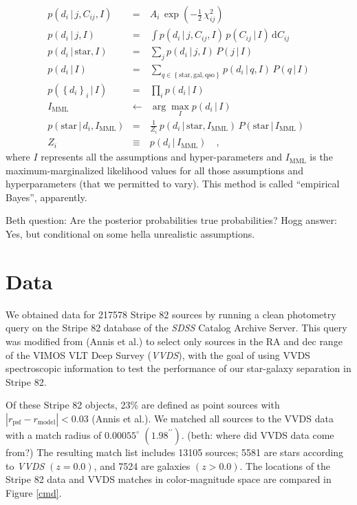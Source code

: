 \documentclass[12pt]{article}
\newcommand{\project}[1]{\textsl{#1}}
\newcommand{\given}{\,|\,}
\newcommand{\dd}{\mathrm{d}}
\newcommand{\setofall}[1]{\left\{{#1}\right\}}
\renewcommand{\star}{\mathrm{star}}
\newcommand{\galaxy}{\mathrm{gal}}
\newcommand{\quasar}{\mathrm{qso}}
\newcommand{\mml}{\mathrm{MML}}
\begin{document}
\begin{eqnarray}
p(d_i\given j,C_{ij},I) &=& A_i\,\exp(-\frac{1}{2}\,\chi^2_{ij})
\\
p(d_i\given j,I) &=& \int p(d_i\given j,C_{ij},I)\,p(C_{ij}\given I)\,\dd C_{ij}
\\
p(d_i\given \star,I) &=& \sum_j p(d_i\given j,I)\,P(j\given I)
\\
p(d_i\given I) &=& \sum_{q\in\setofall{\star,\galaxy,\quasar}} p(d_i\given q,I)\,P(q\given I)
\\
p(\setofall{d_i}_i\given I) &=& \prod_i p(d_i\given I)
\\
I_{\mml} &\leftarrow& \arg\max_I p(d_i\given I)
\\
p(\star\given d_i,I_{\mml}) &=& \frac{1}{Z_i}\,p(d_i\given \star,I_{\mml})\,P(\star\given I_{\mml})
\\
Z_i &\equiv& p(d_i\given I_{\mml})
\quad ,
\end{eqnarray}
where $I$ represents all the assumptions and hyper-parameters and
$I_{\mml}$ is the maximum-marginalized likelihood values for all those
assumptions and hyperparameters (that we permitted to vary).  This
method is called ``empirical Bayes'', apparently.

Beth question: Are the posterior probabilities true probabilities?
Hogg answer: Yes, but conditional on some hella unrealistic
assumptions.

\section{Data}
We obtained data for 217578 Stripe 82 sources by running a clean photometry query on the Stripe 82 database of the \project{SDSS} Catalog Archive Server. This query was modified from (Annis et al.) to select only sources in the RA and dec range of the VIMOS VLT Deep Survey (\project{VVDS}), with the goal of using VVDS spectroscopic information to test the performance of our star-galaxy separation in Stripe 82. 

Of these Stripe 82 objects, 23\% are defined as point sources with $|r_{\mathrm{psf}} - r_{\mathrm{model}}| < 0.03$ (Annis et al.).  We matched all sources to the VVDS data with a match radius of $0.00055^\circ $ $(1.98^{\prime\prime})$. (beth: where did VVDS data come from?) The resulting match list includes 13105 sources; 5581 are stars according to \project{VVDS} $(z = 0.0)$, and 7524 are galaxies $(z > 0.0)$. The locations of the Stripe 82 data and VVDS matches in color-magnitude space are compared in Figure \ref{cmd}.
\end{document}
